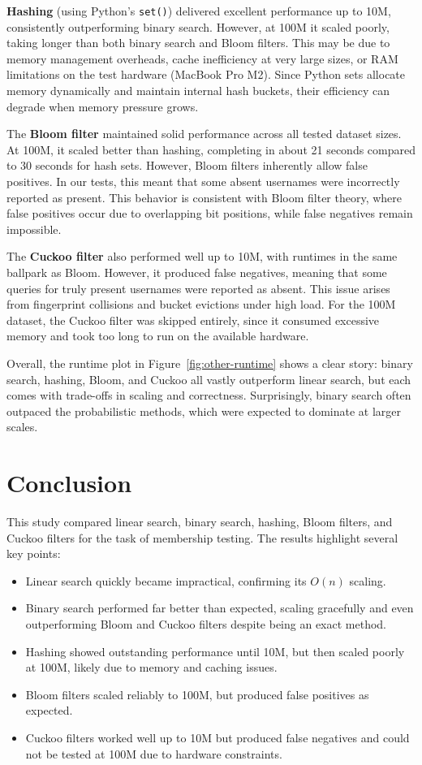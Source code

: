 \documentclass[acmsmall]{acmart}
\begin{document}
\textbf{Hashing} (using Python’s \texttt{set()}) delivered excellent performance up to 10M, consistently outperforming binary search. However, at 100M it scaled poorly, taking longer than both binary search and Bloom filters. This may be due to memory management overheads, cache inefficiency at very large sizes, or RAM limitations on the test hardware (MacBook Pro M2). Since Python sets allocate memory dynamically and maintain internal hash buckets, their efficiency can degrade when memory pressure grows.  

The \textbf{Bloom filter} maintained solid performance across all tested dataset sizes. At 100M, it scaled better than hashing, completing in about 21 seconds compared to 30 seconds for hash sets. However, Bloom filters inherently allow false positives. In our tests, this meant that some absent usernames were incorrectly reported as present. This behavior is consistent with Bloom filter theory, where false positives occur due to overlapping bit positions, while false negatives remain impossible.  

The \textbf{Cuckoo filter} also performed well up to 10M, with runtimes in the same ballpark as Bloom. However, it produced false negatives, meaning that some queries for truly present usernames were reported as absent. This issue arises from fingerprint collisions and bucket evictions under high load. For the 100M dataset, the Cuckoo filter was skipped entirely, since it consumed excessive memory and took too long to run on the available hardware.  

Overall, the runtime plot in Figure~\ref{fig:other-runtime} shows a clear story: binary search, hashing, Bloom, and Cuckoo all vastly outperform linear search, but each comes with trade-offs in scaling and correctness. Surprisingly, binary search often outpaced the probabilistic methods, which were expected to dominate at larger scales.

\section{Conclusion}
This study compared linear search, binary search, hashing, Bloom filters, and Cuckoo filters for the task of membership testing. The results highlight several key points:  
\begin{itemize}
  \item Linear search quickly became impractical, confirming its $O(n)$ scaling.  
  \item Binary search performed far better than expected, scaling gracefully and even outperforming Bloom and Cuckoo filters despite being an exact method.  
  \item Hashing showed outstanding performance until 10M, but then scaled poorly at 100M, likely due to memory and caching issues.  
  \item Bloom filters scaled reliably to 100M, but produced false positives as expected.  
  \item Cuckoo filters worked well up to 10M but produced false negatives and could not be tested at 100M due to hardware constraints.  
\end{itemize}
\end{document}
